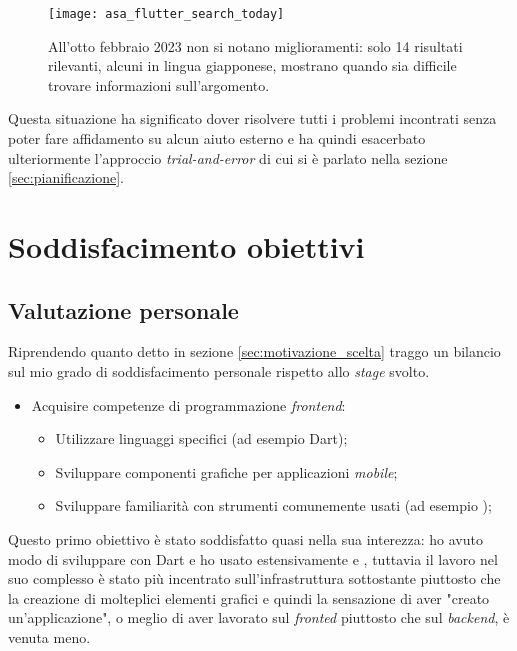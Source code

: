 \begin{figure}[H]
  \centering
  \texttt{[image: asa\_flutter\_search\_today]}
  \caption[Ricerca esatta Flutter e ASA 8 febbraio]{All'otto febbraio 2023 non si notano miglioramenti: solo 14 risultati rilevanti, alcuni in lingua giapponese, mostrano quando sia difficile trovare informazioni sull'argomento.}
  \label{fig:search2}
\end{figure}

Questa situazione ha significato dover risolvere tutti i problemi incontrati senza poter fare affidamento su alcun aiuto esterno e ha quindi esacerbato ulteriormente l'approccio \textit{trial-and-error} di cui si è parlato nella sezione \ref{sec:pianificazione}.


\section{Soddisfacimento obiettivi}
\subsection{Valutazione personale}
Riprendendo quanto detto in sezione \ref{sec:motivazione_scelta} traggo un bilancio sul mio grado di soddisfacimento personale rispetto allo \textit{stage} svolto.

\begin{itemize}
  \item Acquisire competenze di programmazione \textit{frontend}:
      \begin{itemize}
          \item Utilizzare linguaggi specifici (ad esempio Dart);
          \item Sviluppare componenti grafiche per applicazioni \textit{mobile};
          \item Sviluppare familiarità con strumenti comunemente usati (ad esempio \vsc);
      \end{itemize}
\end{itemize}

Questo primo obiettivo è stato soddisfatto quasi nella sua interezza: ho avuto modo di sviluppare con Dart e ho usato estensivamente \vsc{} e \astudio{}, tuttavia il lavoro nel suo complesso è stato più incentrato sull'infrastruttura sottostante piuttosto che la creazione di molteplici elementi grafici e quindi la sensazione di aver "creato un'applicazione", o meglio di aver lavorato sul \textit{fronted} piuttosto che sul \textit{backend}, è venuta meno.

